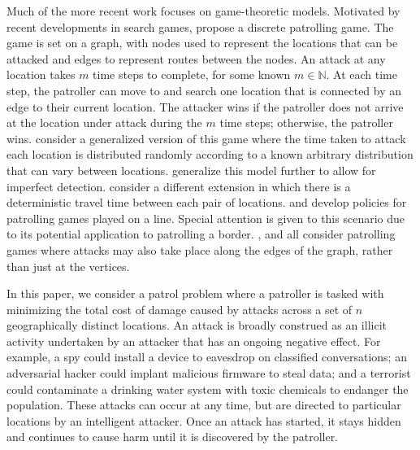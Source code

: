 \documentclass[11pt,a4paper]{article}
\begin{document}
Much of the more recent work focuses on game-theoretic models. %
Motivated by recent developments in search games, \cite{alpern2011} propose a discrete patrolling game.
The game is set on a graph, with nodes used to represent the locations that can be attacked and edges to represent routes between the nodes. 
An attack at any location takes $m$ time steps to complete, for some known $m \in \mathbb{N}$.
At each time step, the patroller can move to and search one location that is connected by an edge to their current location.
The attacker wins if the patroller does not arrive at the location under attack during the $m$ time steps; otherwise, the patroller wins.
\cite{Lin2013} consider a generalized version of this game where the time taken to attack each location is distributed randomly according to a known arbitrary distribution that can vary between locations. 
\cite{Lin2014} generalize this model further to allow for imperfect detection.
\cite{mcgrath2017robust} consider a different extension in which there is a deterministic travel time between each pair of locations.
\cite{papadaki2016} and \cite{alpern2019} develop  policies for patrolling games played on a line.  
Special attention is given to this scenario due to its potential application to patrolling a border.
\cite{alpern2016}, \cite{Garrac2019} and \cite{bui2023} all consider patrolling games where attacks may also take place along the edges of the graph, rather than just at the vertices. 

In this paper, we consider a patrol problem where a patroller is tasked with minimizing the total cost of damage caused by attacks across a set of $n$ geographically distinct locations.
An attack is broadly construed as an illicit activity undertaken by an attacker that has an ongoing negative effect.
For example, a spy could install a device to eavesdrop on classified conversations; an adversarial hacker could implant malicious firmware to steal data; and a terrorist could contaminate a drinking water system with toxic chemicals to endanger the population.
These attacks can occur at any time, but are directed to particular locations by an intelligent attacker. 
Once an attack has started, it stays hidden and continues to cause harm until it is discovered by the patroller.
\end{document}
